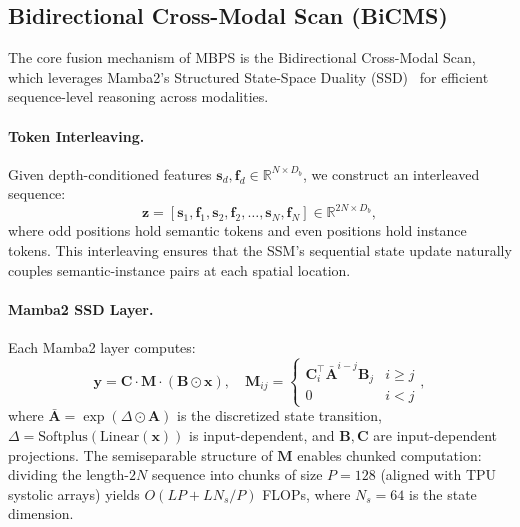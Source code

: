 \documentclass{article}
\begin{document}
\subsection{Bidirectional Cross-Modal Scan (BiCMS)}
\label{sec:bicms}

The core fusion mechanism of MBPS is the Bidirectional Cross-Modal Scan, which leverages Mamba2's Structured State-Space Duality (SSD)~\cite{dao2024mamba2} for efficient sequence-level reasoning across modalities.

\paragraph{Token Interleaving.}
Given depth-conditioned features $\mathbf{s}_d, \mathbf{f}_d \in \mathbb{R}^{N \times D_b}$, we construct an interleaved sequence:
\begin{equation}
\mathbf{z} = [\mathbf{s}_1, \mathbf{f}_1, \mathbf{s}_2, \mathbf{f}_2, \ldots, \mathbf{s}_N, \mathbf{f}_N] \in \mathbb{R}^{2N \times D_b},
\label{eq:interleave}
\end{equation}
where odd positions hold semantic tokens and even positions hold instance tokens. This interleaving ensures that the SSM's sequential state update naturally couples semantic-instance pairs at each spatial location.

\paragraph{Mamba2 SSD Layer.}
Each Mamba2 layer computes:
\begin{equation}
\mathbf{y} = \mathbf{C} \cdot \mathbf{M} \cdot (\mathbf{B} \odot \mathbf{x}), \quad
\mathbf{M}_{ij} = \begin{cases} \mathbf{C}_i^\top \bar{\mathbf{A}}^{i-j} \mathbf{B}_j & i \geq j \\ 0 & i < j \end{cases},
\label{eq:mamba2_ssd}
\end{equation}
where $\bar{\mathbf{A}} = \exp(\Delta \odot \mathbf{A})$ is the discretized state transition, $\Delta = \text{Softplus}(\text{Linear}(\mathbf{x}))$ is input-dependent, and $\mathbf{B}, \mathbf{C}$ are input-dependent projections. The semiseparable structure of $\mathbf{M}$ enables chunked computation: dividing the length-$2N$ sequence into chunks of size $P = 128$ (aligned with TPU systolic arrays) yields $O(LP + LN_s/P)$ FLOPs, where $N_s = 64$ is the state dimension.
\end{document}
